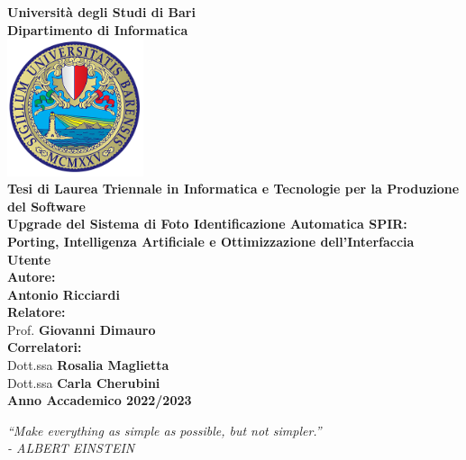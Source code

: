 \documentclass[a4paper,12pt]{report}
\begin{document}

\begin{titlepage}
\centering

\textbf{\large Università degli Studi di Bari} \\
\vspace{0.3cm}
\textbf{\large Dipartimento di Informatica} \\
\vspace{1cm}
\includegraphics[width=40mm,scale=0.5]{assets/images/logo.png} \\
\vspace{1cm}
\textbf{\large Tesi di Laurea Triennale in Informatica e Tecnologie per la Produzione del Software} \\
\vspace{1cm}
\textbf{\LARGE Upgrade del Sistema di Foto Identificazione Automatica SPIR: Porting, Intelligenza Artificiale e Ottimizzazione dell'Interfaccia Utente} \\
\vspace{0.7cm}
\textbf{\large Autore:} \\
\textbf{Antonio Ricciardi} \\
\vspace{0.3cm}
\textbf{\large Relatore:} \\
Prof. \textbf{Giovanni Dimauro} \\
\vspace{0.3cm}
\textbf{\large Correlatori:} \\
Dott.ssa \textbf{Rosalia Maglietta} \\
Dott.ssa \textbf{Carla Cherubini} \\
\vfill
\vspace{0.3cm}
\textbf{ Anno Accademico 2022/2023} %
    
\end{titlepage}
\clearpage
\thispagestyle{empty}

\vspace*{\fill}
\begin{center}
\textit{“Make everything as simple as possible, but not simpler.”\\
- ALBERT EINSTEIN}
\end{center}
\vfill
\clearpage
\tableofcontents
\end{document}
